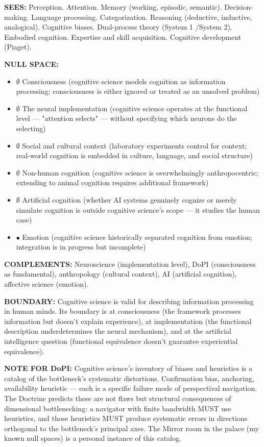 \textbf{SEES:} Perception. Attention. Memory (working, episodic, semantic). Decision-making. Language processing. Categorization. Reasoning (deductive, inductive, analogical). Cognitive biases. Dual-process theory (System 1 /\allowbreak  System 2). Embodied cognition. Expertise and skill acquisition. Cognitive development (Piaget).


\textbf{NULL SPACE:}

\begin{itemize}[nosep,leftmargin=*]
  \item $\emptyset$ Consciousness (cognitive science models cognition as information processing; consciousness is either ignored or treated as an unsolved problem)
  \item $\emptyset$ The neural implementation (cognitive science operates at the functional level — "attention selects" — without specifying which neurons do the selecting)
  \item $\emptyset$ Social and cultural context (laboratory experiments control for context; real-world cognition is embedded in culture, language, and social structure)
  \item $\emptyset$ Non-human cognition (cognitive science is overwhelmingly anthropocentric; extending to animal cognition requires additional framework)
  \item $\emptyset$ Artificial cognition (whether AI systems genuinely cognize or merely simulate cognition is outside cognitive science's scope — it studies the human case)
  \item $\bullet$ Emotion (cognitive science historically separated cognition from emotion; integration is in progress but incomplete)
\end{itemize}


\textbf{COMPLEMENTS:} Neuroscience (implementation level), DoPI (consciousness as fundamental), anthropology (cultural context), AI (artificial cognition), affective science (emotion).


\textbf{BOUNDARY:} Cognitive science is valid for describing information processing in human minds. Its boundary is at consciousness (the framework processes information but doesn't explain experience), at implementation (the functional description underdetermines the neural mechanism), and at the artificial intelligence question (functional equivalence doesn't guarantee experiential equivalence).


\textbf{NOTE FOR DoPI:} Cognitive science's inventory of biases and heuristics is a catalog of the bottleneck's systematic distortions. Confirmation bias, anchoring, availability heuristic — each is a specific failure mode of perspectival navigation. The Doctrine predicts these are not flaws but structural consequences of dimensional bottlenecking: a navigator with finite bandwidth MUST use heuristics, and those heuristics MUST produce systematic errors in directions orthogonal to the bottleneck's principal axes. The Mirror room in the palace (my known null spaces) is a personal instance of this catalog.


